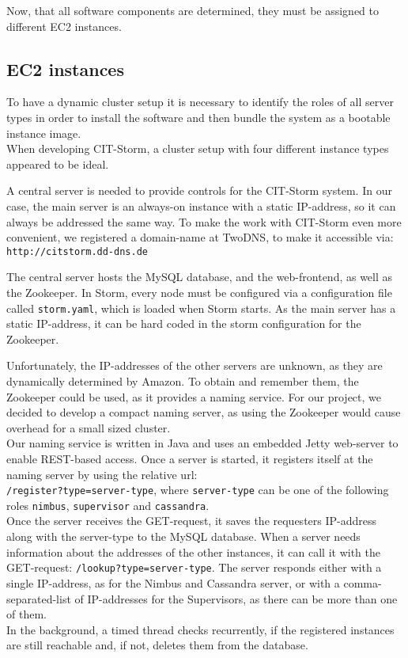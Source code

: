 Now, that all software components are determined, they must be assigned to different EC2 instances.

\subsection{EC2 instances}
To have a dynamic cluster setup it is necessary to identify the roles of all server types in order to install the software and then bundle the system as a bootable instance image.\\

When developing CIT-Storm, a cluster setup with four different instance types appeared to be ideal.

\begin{description}
A central server is needed to provide controls for the CIT-Storm system. In our case, the main server is an always-on instance with a static IP-address, so it can always be addressed the same way. To make the work with CIT-Storm even more convenient, we registered a domain-name at TwoDNS, to make it accessible via:\\
\texttt{http://citstorm.dd-dns.de}

The central server hosts the MySQL database, and the web-frontend, as well as the Zookeeper. In Storm, every node must be configured via a configuration file called \texttt{storm.yaml}, which is loaded when Storm starts. As the main server has a static IP-address, it can be hard coded in the storm configuration for the Zookeeper.

Unfortunately, the IP-addresses of the other servers are unknown, as they are dynamically determined by Amazon. To obtain and remember them, the Zookeeper could be used, as it provides a naming service. For our project, we decided to develop a compact naming server, as using the Zookeeper would cause overhead for a small sized cluster.\\
Our naming service is written in Java and uses an embedded Jetty web-server to enable REST-based access. Once a server is started, it registers itself at the naming server by using the relative url:\\
\texttt{/register?type=server-type},
where \texttt{server-type} can be one of the following roles \texttt{nimbus}, \texttt{supervisor} and \texttt{cassandra}.\\
Once the server receives the GET-request, it saves the requesters IP-address along with the server-type to the MySQL database. When a server needs information about the addresses of the other instances, it can call it with the GET-request: \texttt{/lookup?type=server-type}. The server responds either with a single IP-address, as for the Nimbus and Cassandra server, or with a comma-separated-list of IP-addresses for the Supervisors, as there can be more than one of them.\\
In the background, a timed thread checks recurrently, if the registered instances are still reachable and, if not, deletes them from the database.


\end{description}
